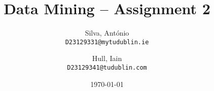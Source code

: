 \title{Data Mining -- Assignment 2}
\author{
  Silva, António\\
  \texttt{D23129331@mytudublin.ie}
  \and
  Hull, Iain\\
  \texttt{D23129341@tudublin.com}
}
\date{\today}
